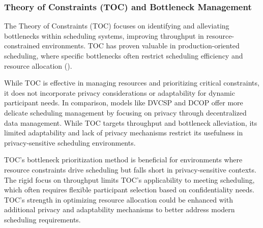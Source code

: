 \begin{spacing}{1.0}
    \subsubsection{Theory of Constraints (TOC) and Bottleneck Management}
    \indent \indent The Theory of Constraints (TOC) focuses on identifying and alleviating bottlenecks within scheduling systems, improving throughput in resource-constrained environments. TOC has proven valuable in production-oriented scheduling, where specific bottlenecks often restrict scheduling efficiency and resource allocation (\cite{golmohammadi2015}). 
    \par While TOC is effective in managing resources and prioritizing critical constraints, it does not incorporate privacy considerations or adaptability for dynamic participant needs. In comparison, models like DVCSP and DCOP offer more delicate scheduling management by focusing on privacy through decentralized data management. While TOC targets throughput and bottleneck alleviation, its limited adaptability and lack of privacy mechanisms restrict its usefulness in privacy-sensitive scheduling environments.
    \par TOC’s bottleneck prioritization method is beneficial for environments where resource constraints drive scheduling but falls short in privacy-sensitive contexts. The rigid focus on throughput limits TOC’s applicability to meeting scheduling, which often requires flexible participant selection based on confidentiality needs. TOC’s strength in optimizing resource allocation could be enhanced with additional privacy and adaptability mechanisms to better address modern scheduling requirements.

\end{spacing}
